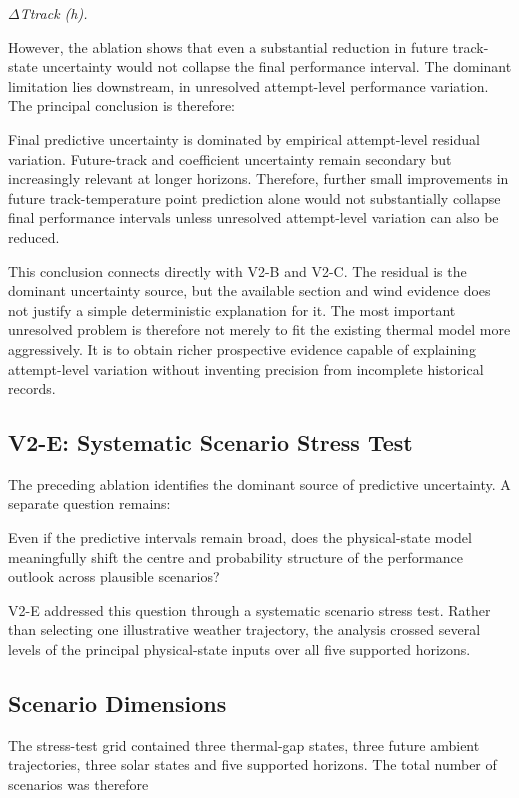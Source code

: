 \begin{center}\textit{\ensuremath{\Delta}Ttrack (h).}\end{center}

However, the ablation shows that even a substantial reduction in future track-state uncertainty would not collapse the final performance interval. The dominant limitation lies downstream, in unresolved attempt-level performance variation. The principal conclusion is therefore:

Final predictive uncertainty is dominated by empirical attempt-level residual variation. Future-track and coefficient uncertainty remain secondary but increasingly relevant at longer horizons. Therefore, further small improvements in future track-temperature point prediction alone would not substantially collapse final performance intervals unless unresolved attempt-level variation can also be reduced.

This conclusion connects directly with V2-B and V2-C. The residual is the dominant uncertainty source, but the available section and wind evidence does not justify a simple deterministic explanation for it. The most important unresolved problem is therefore not merely to fit the existing thermal model more aggressively. It is to obtain richer prospective evidence capable of explaining attempt-level variation without inventing precision from incomplete historical records.

\subsection{V2-E: Systematic Scenario Stress Test}
The preceding ablation identifies the dominant source of predictive uncertainty. A separate question remains:

Even if the predictive intervals remain broad, does the physical-state model meaningfully shift the centre and probability structure of the performance outlook across plausible scenarios?

V2-E addressed this question through a systematic scenario stress test. Rather than selecting one illustrative weather trajectory, the analysis crossed several levels of the principal physical-state inputs over all five supported horizons.

\subsection{Scenario Dimensions}
The stress-test grid contained three thermal-gap states, three future ambient trajectories, three solar states and five supported horizons. The total number of scenarios was therefore

